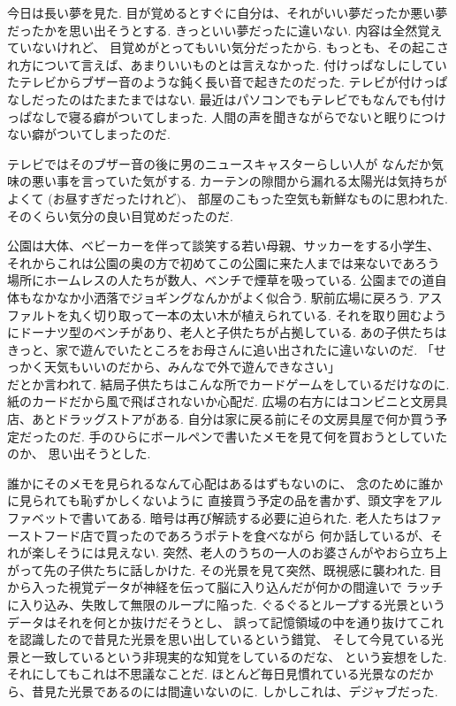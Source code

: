 
今日は長い夢を見た.
目が覚めるとすぐに自分は、それがいい夢だったか悪い夢だったかを思い出そうとする.
きっといい夢だったに違いない.
内容は全然覚えていないけれど、
目覚めがとってもいい気分だったから.
もっとも、その起こされ方について言えば、あまりいいものとは言えなかった.
付けっぱなしにしていたテレビからブザー音のような鈍く長い音で起きたのだった.
テレビが付けっぱなしだったのはたまたまではない.
最近はパソコンでもテレビでもなんでも付けっぱなしで寝る癖がついてしまった.
人間の声を聞きながらでないと眠りにつけない癖がついてしまったのだ.

テレビではそのブザー音の後に男のニュースキャスターらしい人が
なんだか気味の悪い事を言っていた気がする.
カーテンの隙間から漏れる太陽光は気持ちがよくて
(お昼すぎだったけれど)、
部屋のこもった空気も新鮮なものに思われた.
そのくらい気分の良い目覚めだったのだ.

公園は大体、ベビーカーを伴って談笑する若い母親、サッカーをする小学生、
それからこれは公園の奥の方で初めてこの公園に来た人までは来ないであろう
場所にホームレスの人たちが数人、ベンチで煙草を吸っている.
公園までの道自体もなかなか小洒落でジョギングなんかがよく似合う.
駅前広場に戻ろう.
アスファルトを丸く切り取って一本の太い木が植えられている.
それを取り囲むようにドーナツ型のベンチがあり、老人と子供たちが占拠している.
あの子供たちはきっと、家で遊んでいたところをお母さんに追い出されたに違いないのだ.
「せっかく天気もいいのだから、みんなで外で遊んできなさい」\\
だとか言われて.
結局子供たちはこんな所でカードゲームをしているだけなのに.
紙のカードだから風で飛ばされないか心配だ.
広場の右方にはコンビニと文房具店、あとドラッグストアがある.
自分は家に戻る前にその文房具屋で何か買う予定だったのだ.
手のひらにボールペンで書いたメモを見て何を買おうとしていたのか、
思い出そうとした.

誰かにそのメモを見られるなんて心配はあるはずもないのに、
念のために誰かに見られても恥ずかしくないように
直接買う予定の品を書かず、頭文字をアルファベットで書いてある.
暗号は再び解読する必要に迫られた.
老人たちはファーストフード店で買ったのであろうポテトを食べながら
何か話しているが、それが楽しそうには見えない.
突然、老人のうちの一人のお婆さんがやおら立ち上がって先の子供たちに話しかけた.
その光景を見て突然、既視感に襲われた.
目から入った視覚データが神経を伝って脳に入り込んだが何かの間違いで
ラッチに入り込み、失敗して無限のループに陥った.
ぐるぐるとループする光景というデータはそれを何とか抜けだそうとし、
誤って記憶領域の中を通り抜けてこれを認識したので昔見た光景を思い出しているという錯覚、
そして今見ている光景と一致しているという非現実的な知覚をしているのだな、
という妄想をした.
それにしてもこれは不思議なことだ.
ほとんど毎日見慣れている光景なのだから、昔見た光景であるのには間違いないのに.
しかしこれは、デジャブだった.

